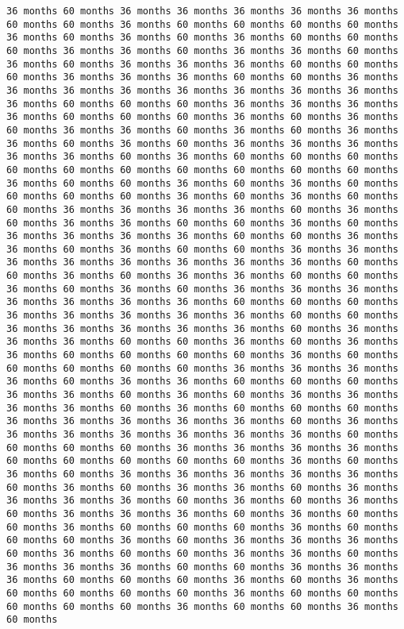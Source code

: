 \documentclass[11pt]{article}
\begin{document}
\begin{Verbatim}[commandchars=\\\{\}, frame=single, framerule=2mm, rulecolor=\color{outerrorbackground}]
36 months 60 months 36 months 36 months 36 months 36 months 36 months 60 months 60 months 36 months 60 months 60 months 60 months 60 months 36 months 60 months 36 months 60 months 36 months 60 months 60 months 60 months 36 months 36 months 60 months 36 months 36 months 60 months 36 months 60 months 36 months 36 months 36 months 60 months 60 months 60 months 36 months 36 months 36 months 60 months 60 months 36 months 36 months 36 months 36 months 36 months 36 months 36 months 36 months 36 months 60 months 60 months 60 months 36 months 36 months 36 months 36 months 60 months 60 months 60 months 36 months 60 months 36 months 60 months 36 months 36 months 60 months 36 months 60 months 36 months 36 months 60 months 36 months 60 months 36 months 36 months 36 months 36 months 36 months 60 months 36 months 60 months 60 months 60 months 60 months 60 months 60 months 60 months 60 months 60 months 60 months 36 months 60 months 60 months 36 months 60 months 36 months 60 months 60 months 60 months 60 months 36 months 60 months 36 months 60 months 60 months 36 months 36 months 36 months 36 months 60 months 36 months 60 months 36 months 36 months 60 months 60 months 36 months 60 months 36 months 36 months 36 months 36 months 60 months 60 months 36 months 36 months 60 months 36 months 60 months 60 months 36 months 36 months 36 months 36 months 36 months 36 months 36 months 36 months 60 months 60 months 36 months 60 months 36 months 36 months 60 months 60 months 36 months 60 months 36 months 60 months 36 months 36 months 36 months 36 months 36 months 36 months 36 months 60 months 60 months 60 months 36 months 36 months 36 months 36 months 36 months 60 months 60 months 36 months 36 months 36 months 36 months 36 months 60 months 36 months 36 months 36 months 60 months 60 months 36 months 60 months 36 months 36 months 60 months 60 months 60 months 60 months 36 months 60 months 60 months 60 months 60 months 60 months 36 months 36 months 36 months 36 months 60 months 36 months 36 months 60 months 60 months 60 months 36 months 36 months 60 months 36 months 60 months 36 months 36 months 36 months 36 months 60 months 36 months 60 months 60 months 60 months 36 months 36 months 36 months 36 months 36 months 60 months 36 months 36 months 36 months 36 months 36 months 36 months 36 months 60 months 60 months 60 months 60 months 36 months 36 months 36 months 36 months 60 months 60 months 60 months 60 months 60 months 36 months 60 months 36 months 60 months 36 months 36 months 36 months 36 months 36 months 60 months 36 months 60 months 36 months 36 months 60 months 36 months 36 months 36 months 36 months 60 months 36 months 60 months 36 months 60 months 36 months 36 months 36 months 60 months 36 months 60 months 60 months 36 months 60 months 60 months 60 months 36 months 60 months 60 months 60 months 36 months 60 months 36 months 36 months 36 months 60 months 36 months 60 months 60 months 36 months 36 months 60 months 36 months 36 months 36 months 60 months 60 months 36 months 36 months 36 months 60 months 60 months 60 months 36 months 60 months 36 months 60 months 60 months 60 months 60 months 36 months 60 months 60 months 60 months 60 months 60 months 36 months 60 months 60 months 36 months 60 months 
\end{Verbatim}
\end{document}
